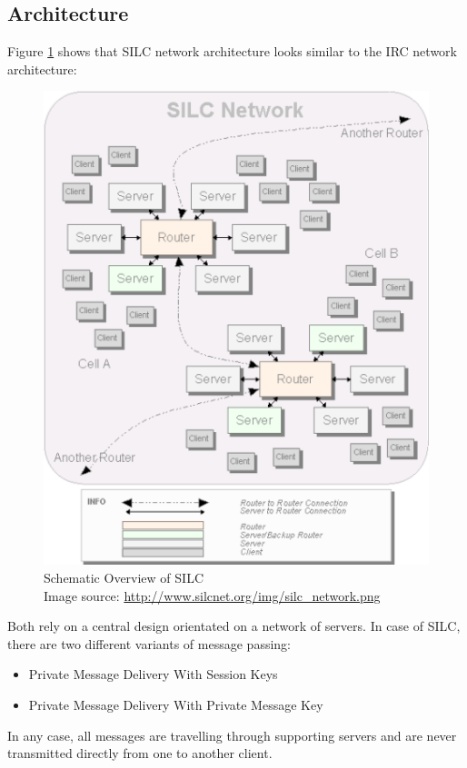 \subsection{Architecture}
Figure \ref{silcoverview} shows 
that SILC network architecture looks similar to the IRC network architecture: 
\begin{figure}
    \centering
    \caption[Schematic Overview of SILC]{Schematic Overview of SILC\\Image source: \protect\url{http://www.silcnet.org/img/silc_network.png}}
    \label{silcoverview}
    \includegraphics[scale=0.8]{silc_network.png}
\end{figure}
Both rely on a central design orientated on a network of servers.
In case of SILC, there are two different variants of message passing:
\begin{itemize}
\item Private Message Delivery With Session Keys
\item Private Message Delivery With Private Message Key
\end{itemize}
In any case, all messages are travelling through supporting servers and are never
transmitted directly from one to another client.
